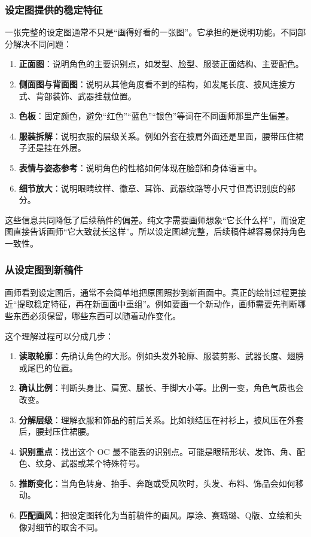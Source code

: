 \subsubsection{设定图提供的稳定特征}

一张完整的设定图通常不只是“画得好看的一张图”。它承担的是说明功能。不同部分解决不同问题：
\begin{enumerate}
    \item \textbf{正面图}：说明角色的主要识别点，如发型、脸型、服装正面结构、主要配色。
    \item \textbf{侧面图与背面图}：说明从其他角度看不到的结构，如发尾长度、披风连接方式、背部装饰、武器挂载位置。
    \item \textbf{色板}：固定颜色，避免“红色”“蓝色”“银色”等词在不同画师那里产生偏差。
    \item \textbf{服装拆解}：说明衣服的层级关系。例如外套在披肩外面还是里面，腰带压住裙子还是挂在外层。
    \item \textbf{表情与姿态参考}：说明角色的性格如何体现在脸部和身体语言中。
    \item \textbf{细节放大}：说明眼睛纹样、徽章、耳饰、武器纹路等小尺寸但高识别度的部分。
\end{enumerate}

这些信息共同降低了后续稿件的偏差。纯文字需要画师想象“它长什么样”，而设定图直接告诉画师“它大致就长这样”。所以设定图越完整，后续稿件越容易保持角色一致性。

\subsubsection{从设定图到新稿件}

画师看到设定图后，通常不会简单地把原图照抄到新画面中。真正的绘制过程更接近“提取稳定特征，再在新画面中重组”。例如要画一个新动作，画师需要先判断哪些东西必须保留，哪些东西可以随着动作变化。

这个理解过程可以分成几步：
\begin{enumerate}
    \item \textbf{读取轮廓}：先确认角色的大形。例如头发外轮廓、服装剪影、武器长度、翅膀或尾巴的位置。
    \item \textbf{确认比例}：判断头身比、肩宽、腿长、手脚大小等。比例一变，角色气质也会改变。
    \item \textbf{分解层级}：理解衣服和饰品的前后关系。比如领结压在衬衫上，披风压在外套后，腰封压住裙腰。
    \item \textbf{识别重点}：找出这个 OC 最不能丢的识别点。可能是眼睛形状、发饰、角、配色、纹身、武器或某个特殊符号。
    \item \textbf{推断变化}：当角色转身、抬手、奔跑或受风吹时，头发、布料、饰品会如何移动。
    \item \textbf{匹配画风}：把设定图转化为当前稿件的画风。厚涂、赛璐璐、Q版、立绘和头像对细节的取舍不同。
\end{enumerate}

